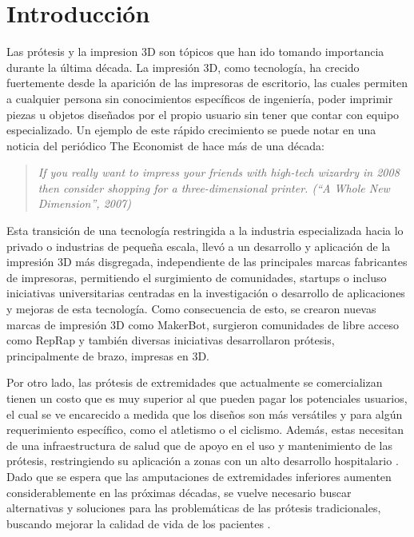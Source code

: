 \chapter{Introducción}

Las prótesis y la impresion 3D son tópicos que han ido tomando importancia durante la última década. La impresión 3D, como tecnología, ha crecido fuertemente desde la aparición de las impresoras de escritorio, las cuales permiten a cualquier persona sin conocimientos específicos de ingeniería, poder imprimir piezas u objetos diseñados por el propio usuario sin tener que contar con equipo especializado. Un ejemplo de este rápido crecimiento se puede notar en una noticia del periódico The Economist de hace más de una década: 

\begin{quote}
\textit{If you really want to impress your friends with high-tech wizardry in 2008 then consider shopping for a three-dimensional printer. (``A Whole New Dimension'', 2007)}
\end{quote}


Esta transición de una tecnología restringida a la industria especializada hacia lo privado o industrias de pequeña escala, llevó a un desarrollo y aplicación de la impresión 3D más disgregada, independiente de las principales marcas fabricantes de impresoras, permitiendo el surgimiento de comunidades, startups o incluso iniciativas universitarias centradas en la investigación o desarrollo de aplicaciones y mejoras de esta tecnología. Como consecuencia de esto, se crearon nuevas marcas de impresión 3D como MakerBot, surgieron comunidades de libre acceso como RepRap y también diversas iniciativas desarrollaron prótesis, principalmente de brazo, impresas en 3D.

Por otro lado, las prótesis de extremidades que actualmente se comercializan tienen un costo que es muy superior al que pueden pagar los potenciales usuarios, el cual se ve encarecido a medida que los diseños son más versátiles y para algún requerimiento específico, como el atletismo o el ciclismo. Además, estas necesitan de una infraestructura de salud que de apoyo en el uso y mantenimiento de las prótesis, restringiendo su aplicación a zonas con un alto desarrollo hospitalario \cite{vujaklija20183d}. Dado que se espera que las amputaciones de extremidades inferiores aumenten considerablemente en las próximas décadas, se vuelve necesario buscar alternativas y soluciones para las problemáticas de las prótesis tradicionales, buscando mejorar la calidad de vida de los pacientes \cite{franchignoni2015rasch}.

